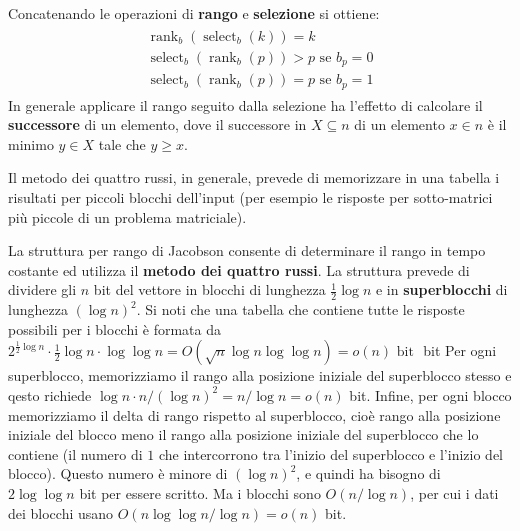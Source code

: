 \documentclass[\main/main.tex]{subfiles}
\begin{document}
\begin{observation}
    Concatenando le operazioni di \textbf{rango} e \textbf{selezione} si ottiene:
    \begin{align*}
        \begin{array}{l}
            {\operatorname{rank}_{b}\left(\operatorname{select}_{b}(k)\right)=k} \\
            {\operatorname{select}_{b}\left(\operatorname{rank}_{b}(p)\right)>p \text { se } b_{p}=0} \\
            {\operatorname{select}_{b}\left(\operatorname{rank}_{b}(p)\right)=p \text { se } b_{p}=1}
        \end{array}
    \end{align*}
    In generale applicare il rango seguito dalla selezione ha l'effetto di calcolare il \textbf{successore} di un elemento, dove il successore in \(X \subseteq n\) di un elemento \(x \in n\) è il minimo \(y \in X \) tale che \(y\geq x\).
\end{observation}
\clearpage
\begin{definition}
    Il metodo dei quattro russi, in generale, prevede di memorizzare in una tabella i risultati per piccoli blocchi dell'input (per esempio le risposte per sotto-matrici più piccole di un problema matriciale).
\end{definition}
\begin{definition}
    La struttura per rango di Jacobson consente di determinare il rango in tempo costante ed utilizza il \textbf{metodo dei quattro russi}. La struttura prevede di dividere gli \(n\) bit del vettore in blocchi di lunghezza \(\frac{1}{2} \log n\) e in \textbf{superblocchi} di lunghezza \((\log n)^{2}\). Si noti che una tabella che contiene tutte le risposte possibili per i blocchi è formata da \(
        2^{\frac{1}{2} \log n} \cdot \frac{1}{2} \log n \cdot \log \log n=O(\sqrt{n} \log n \log \log n)=o(n) \text { bit }
    \) bit
    Per ogni superblocco, memorizziamo il rango alla posizione iniziale del superblocco stesso e qesto richiede \(\log n \cdot n /(\log n)^{2}=n / \log n=o(n)\) bit. Infine, per ogni blocco memorizziamo il delta di rango rispetto al superblocco, cioè rango alla posizione iniziale del blocco meno il rango alla posizione iniziale del superblocco che lo contiene (il numero di \(1\) che intercorrono tra l'inizio del superblocco e l'inizio del blocco). Questo numero è minore di \((\log n)^{2}\), e quindi ha bisogno di \(2 \log \log n\) bit per essere scritto. Ma i blocchi sono \(O(n / \log n)\), per cui i dati dei blocchi usano \(O(n \log \log n / \log n)=o(n)\) bit.
\end{definition}
\end{document}

